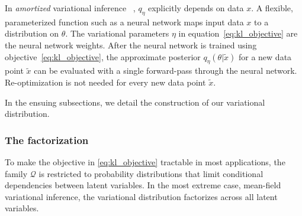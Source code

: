 In {\itshape amortized} variational inference
~\cite{kingma2013autoencoding, rezende2014stochastic}, $q_\eta$ explicitly depends on data $x$. A flexible, parameterized function such as a neural network maps input data $x$ to
a distribution on $\theta$. 
The variational parameters $\eta$ in equation~\eqref{eq:kl_objective} 
are the neural network weights. 
After the neural network is trained using 
objective~\eqref{eq:kl_objective}, the 
approximate posterior $q_\eta(\theta | \tilde x)$ for a new data point 
$\tilde x$ can be evaluated with a single forward-pass through the neural network. 
Re-optimization is not needed for every new data point $\tilde x$. 

In the ensuing subsections, we detail the construction of our variational distribution. 

\subsubsection{The factorization}
To make the objective in \eqref{eq:kl_objective} tractable in most 
applications, the family $\mathcal{Q}$ is restricted to probability distributions 
that limit conditional dependencies between latent variables. In the most extreme case, mean-field variational inference, the variational distribution factorizes across all latent variables. 

